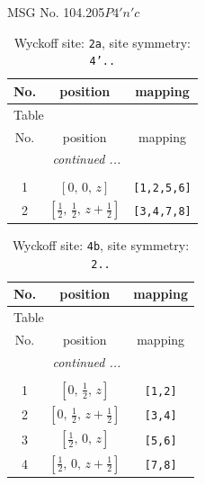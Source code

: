\documentclass[fleqn,8pt]{jsarticle}
\begin{document}
\setcounter{MaxMatrixCols}{32}

\renewcommand{\tablename}{Table~}
\renewcommand{\figurename}{Figure~}
\begin{center}
\LARGE
MSG No. 104.205\quad$P4'n'c$
\end{center}
\renewcommand{\arraystretch}{1.2}
\begin{longtable}{ccc}
\caption{Wyckoff site: {\tt 2a}, site symmetry: {\tt 4'..}}
 \\
 \hline \hline
No. & position & mapping \\ \hline \endfirsthead

\multicolumn{2}{l}{\tablename\ \thetable{}} \\
 \hline \hline
No. & position & mapping \\ \hline \endhead

 \hline \hline
\multicolumn{2}{r}{\footnotesize\it continued ...} \\ \endfoot

 \hline \hline
\multicolumn{2}{r}{} \\ \endlastfoot

1 & $\left[ 0,\, 0,\, z \right]$ & {\tt [1,2,5,6]} \\ \hline
2 & $\left[ \frac{1}{2},\, \frac{1}{2},\, z + \frac{1}{2} \right]$ & {\tt [3,4,7,8]} \\
\end{longtable}
\renewcommand{\arraystretch}{1.2}
\begin{longtable}{ccc}
\caption{Wyckoff site: {\tt 4b}, site symmetry: {\tt 2..}}
 \\
 \hline \hline
No. & position & mapping \\ \hline \endfirsthead

\multicolumn{2}{l}{\tablename\ \thetable{}} \\
 \hline \hline
No. & position & mapping \\ \hline \endhead

 \hline \hline
\multicolumn{2}{r}{\footnotesize\it continued ...} \\ \endfoot

 \hline \hline
\multicolumn{2}{r}{} \\ \endlastfoot

1 & $\left[ 0,\, \frac{1}{2},\, z \right]$ & {\tt [1,2]} \\ \hline
2 & $\left[ 0,\, \frac{1}{2},\, z + \frac{1}{2} \right]$ & {\tt [3,4]} \\ \hline
3 & $\left[ \frac{1}{2},\, 0,\, z \right]$ & {\tt [5,6]} \\ \hline
4 & $\left[ \frac{1}{2},\, 0,\, z + \frac{1}{2} \right]$ & {\tt [7,8]} \\
\end{longtable}
\end{document}
